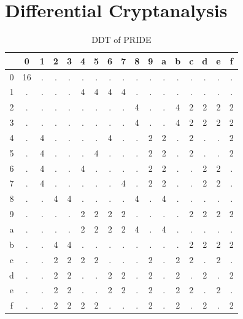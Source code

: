 \documentclass{transcrypto}
\begin{document}
	\section{Differential Cryptanalysis}
	\begin{table}[H]
		\centering
		\begin{tabular}{c|cccccccccccccccc}
			&0 &  1 &  2 &  3 &  4 &  5 &  6 &  7 &  8 &  9 &  a &  b &  c &  d &  e &  f\\
			\hline 
			0 & 16 &  . &  . &  . &  . &  . &  . &  . &  . &  . &  . &  . &  . &  . &  . &  .\\ 
			1 &  . &  . &  . &  . &  4 &  4 &  4 &  4 &  . &  . &  . &  . &  . &  . &  . &  .\\ 
			2 &  . &  . &  . &  . &  . &  . &  . &  . &  4 &  . &  . &  4 &  2 &  2 &  2 &  2\\ 
			3 &  . &  . &  . &  . &  . &  . &  . &  . &  4 &  . &  . &  4 &  2 &  2 &  2 &  2\\ 
			4 &  . &  4 &  . &  . &  . &  . &  4 &  . &  . &  2 &  2 &  . &  2 &  . &  . &  2\\ 
			5 &  . &  4 &  . &  . &  . &  4 &  . &  . &  . &  2 &  2 &  . &  2 &  . &  . &  2\\ 
			6 &  . &  4 &  . &  . &  4 &  . &  . &  . &  . &  2 &  2 &  . &  . &  2 &  2 &  .\\ 
			7 &  . &  4 &  . &  . &  . &  . &  . &  4 &  . &  2 &  2 &  . &  . &  2 &  2 &  .\\ 
			8 &  . &  . &  4 &  4 &  . &  . &  . &  . &  4 &  . &  4 &  . &  . &  . &  . &  .\\ 
			9 &  . &  . &  . &  . &  2 &  2 &  2 &  2 &  . &  . &  . &  . &  2 &  2 &  2 &  2\\ 
			a &  . &  . &  . &  . &  2 &  2 &  2 &  2 &  4 &  . &  4 &  . &  . &  . &  . &  .\\ 
			b &  . &  . &  4 &  4 &  . &  . &  . &  . &  . &  . &  . &  . &  2 &  2 &  2 &  2\\ 
			c &  . &  . &  2 &  2 &  2 &  2 &  . &  . &  . &  2 &  . &  2 &  2 &  . &  2 &  .\\ 
			d &  . &  . &  2 &  2 &  . &  . &  2 &  2 &  . &  2 &  . &  2 &  . &  2 &  . &  2\\ 
			e &  . &  . &  2 &  2 &  . &  . &  2 &  2 &  . &  2 &  . &  2 &  2 &  . &  2 &  .\\ 
			f &  . &  . &  2 &  2 &  2 &  2 &  . &  . &  . &  2 &  . &  2 &  . &  2 &  . &  2\\  
		\end{tabular}
		\caption{DDT of PRIDE}
	\end{table}
	
\end{document}
